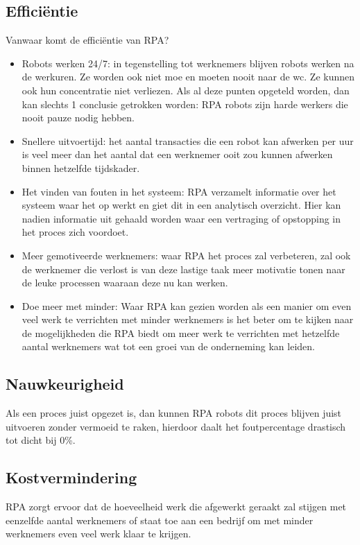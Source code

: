 \subsection{Efficiëntie}
Vanwaar komt de efficiëntie van RPA?
\begin{itemize}
	\item Robots werken 24/7: in tegenstelling tot werknemers blijven robots werken na de werkuren. Ze worden ook niet moe en moeten nooit naar de wc. Ze kunnen ook hun concentratie niet verliezen. Als al deze punten opgeteld worden, dan kan slechts 1 conclusie getrokken worden: RPA robots zijn harde werkers die nooit pauze nodig hebben.
	\item Snellere uitvoertijd: het aantal transacties die een robot kan afwerken per uur is veel meer dan het aantal dat een werknemer ooit zou kunnen afwerken binnen hetzelfde tijdskader.
	\item Het vinden van fouten in het systeem: RPA verzamelt informatie over het systeem waar het op werkt en giet dit in een analytisch overzicht. Hier kan nadien informatie uit gehaald worden waar een vertraging of opstopping in het proces zich voordoet.
	\item Meer gemotiveerde werknemers: waar RPA het proces zal verbeteren, zal ook de werknemer die verlost is van deze lastige taak meer motivatie tonen naar de leuke processen waaraan deze nu kan werken.
	\item Doe meer met minder: Waar RPA kan gezien worden als een manier om even veel werk te verrichten met minder werknemers is het beter om te kijken naar de mogelijkheden die RPA biedt om meer werk te verrichten met hetzelfde aantal werknemers wat tot een groei van de onderneming kan leiden.
\end{itemize}

\autocite{efficiencyRPA}
\subsection{Nauwkeurigheid}
Als een proces juist opgezet is, dan kunnen RPA robots dit proces blijven juist uitvoeren zonder vermoeid te raken, hierdoor daalt het foutpercentage drastisch tot dicht bij 0\%. \autocite{efficiencyRPA}

\subsection{Kostvermindering}
RPA zorgt ervoor dat de hoeveelheid werk die afgewerkt geraakt zal stijgen met eenzelfde aantal werknemers of staat toe aan een bedrijf om met minder werknemers even veel werk klaar te krijgen. \autocite{efficiencyRPA}

